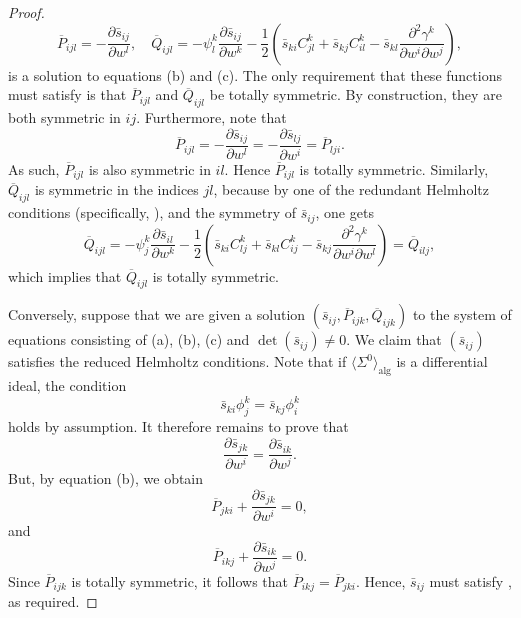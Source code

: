 \documentclass[10pt,a4paper]{amsart}
\begin{document}
\begin{proof}
\begin{equation*}
    \overline{P}_{ijl}=-\frac{\partial \bar{s}_{ij}}{\partial w^l},\quad \overline{Q}_{ijl}=-\psi_l^k \frac{\partial \bar{s}_{ij}}{\partial w^k}-\frac{1}{2}\left(\bar{s}_{ki}C_{jl}^k+\bar{s}_{kj}C_{il}^k-\bar{s}_{kl}\frac{\partial^2 \gamma^k}{\partial w^i \partial w^j}\right),
\end{equation*}
is a solution to equations (b) and (c). The only requirement that these functions must satisfy is that $\overline{P}_{ijl}$ and $\overline{Q}_{ijl}$ be totally symmetric. By construction, they are both symmetric in $ij$. Furthermore, note that
\begin{equation*}
    \overline{P}_{ijl}=-\frac{\partial \bar{s}_{ij}}{\partial w^l}=-\frac{\partial \bar{s}_{lj}}{\partial w^i}=\overline{P}_{lji}.
\end{equation*}
As such, $\overline{P}_{ijl}$ is also symmetric in $il$. Hence $\overline{P}_{ijl}$ is totally symmetric. Similarly, $\overline{Q}_{ijl}$ is symmetric in the indices $jl$, because by one of the redundant Helmholtz conditions (specifically, ), and the symmetry of $\bar{s}_{ij}$, one gets
\begin{equation*}
    \overline{Q}_{ijl}=-\psi_j^k \frac{\partial \bar{s}_{il}}{\partial w^k}-\frac{1}{2}\left(\bar{s}_{ki}C_{lj}^k+\bar{s}_{kl}C_{ij}^k-\bar{s}_{kj}\frac{\partial^2 \gamma^k}{\partial w^i \partial w^l}\right)=\overline{Q}_{ilj},
\end{equation*}
which implies that $\overline{Q}_{ijl}$ is totally symmetric.

Conversely, suppose that we are given a solution $(\bar{s}_{ij},\overline{P}_{ijk}, \overline{Q}_{ijk})$ to the system of equations consisting of (a), (b), (c) and $\det(\bar{s}_{ij})\neq 0$. We claim that $(\bar{s}_{ij})$ satisfies the reduced Helmholtz conditions. Note that if $\langle \Sigma^0\rangle_{\mathrm{alg}}$ is a differential ideal, the condition
\begin{equation*}
    \bar{s}_{ki}\phi_j^k=\bar{s}_{kj}\phi_i^k
\end{equation*}
holds by assumption. It therefore remains to prove that
\begin{equation}\label{eqn:helmholtzDV}
    \frac{\partial \bar{s}_{jk}}{\partial w^i}=\frac{\partial \bar{s}_{ik}}{\partial w^j}.
\end{equation}
But, by equation (b), we obtain
\begin{equation*}
    \overline{P}_{jki}+\frac{\partial \bar{s}_{jk}}{\partial w^i}=0,
\end{equation*}
and
\begin{equation*}
    \overline{P}_{ikj}+\frac{\partial \bar{s}_{ik}}{\partial w^j}=0.
\end{equation*}
Since $\overline{P}_{ijk}$ is totally symmetric, it follows that $\overline{P}_{ikj}=\overline{P}_{jki}$. Hence, $\bar{s}_{ij}$ must satisfy , as required.
\end{proof}
\end{document}
